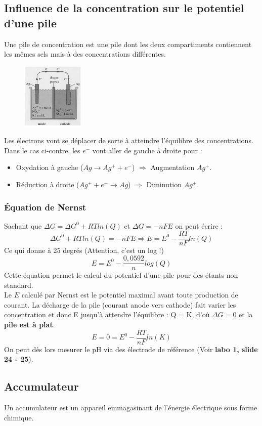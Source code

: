 \documentclass[12pt, a4paper]{article}
\begin{document}
\subsection{Influence de la concentration sur le potentiel d'une pile}
Une pile de concentration est une pile dont les deux compartiments contiennent les mêmes sels mais à des concentrations différentes. 
\begin{figure}
\includegraphics[width=3cm]{image3.png}
\end{figure}

Les électrons vont se déplacer de sorte à atteindre l'équilibre des concentrations. Dans le cas ci-contre, les $e^-$ vont aller de gauche à droite pour :
\begin{itemize}
\item Oxydation à gauche ($Ag \rightarrow Ag^+ + e^-$) $\Rightarrow$ Augmentation $Ag^+$.
\item Réduction à droite ($Ag^+ +e^- \rightarrow Ag$) $\Rightarrow$ Diminution $Ag^+$.
\end{itemize}
\subsubsection*{Équation de Nernst}
Sachant que $\Delta G = \Delta G^0 + RTln(Q)$ et $\Delta G = -nFE$ on peut écrire : 
$$\Delta G^0 + RTln(Q) = -nFE \Rightarrow E = E^0 - \frac{RT}{nF}ln(Q)$$
Ce qui donne à 25 degrés (Attention, c'est un log !)
$$E = E^0 - \frac{0,0592}{n}log(Q)$$
Cette équation permet le calcul du potentiel d'une pile pour des étants non standard.\\

Le $E$ calculé par Nernst est le potentiel maximal avant toute production de courant. La décharge de la pile (courant anode vers cathode) fait varier les concentration et donc E jusqu'à attendre l'équilibre : Q = K, d'où $\Delta G = 0$ et la \textbf{pile est à plat}.
$$E = 0 = E^0 - \frac{RT}{nF}ln(K)$$
On peut dès lors mesurer le pH via des électrode de référence (Voir \textbf{labo 1, slide 24 - 25}).

\subsection{Accumulateur}
Un accumulateur est un appareil emmagasinant de l'énergie électrique sous forme chimique.
\end{document}
